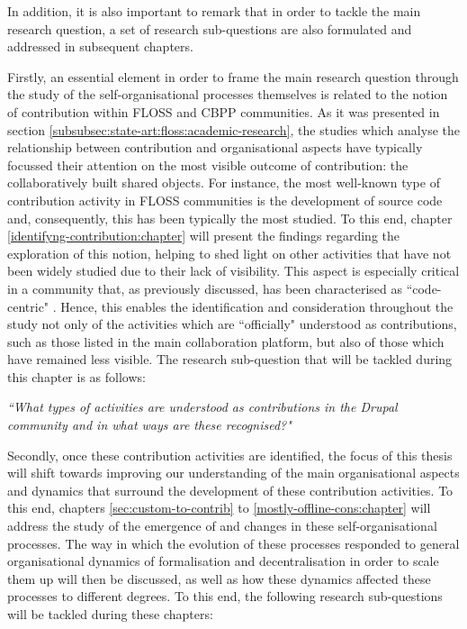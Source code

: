 In addition, it is also important to remark that in order to tackle the main research question, a set of research sub-questions are also formulated and addressed in subsequent chapters.

Firstly, an essential element in order to frame the main research question through the study of the self-organisational processes themselves is related to the notion of contribution within FLOSS and CBPP communities. As it was presented in section \ref{subsubsec:state-art:floss:academic-research}, the studies which analyse the relationship between contribution and organisational aspects have typically focussed their attention on the most visible outcome of contribution: the collaboratively built shared objects. For instance, the most well-known type of contribution activity in FLOSS communities is the development of source code and, consequently, this has been typically the most studied. To this end, chapter \ref{identifyng-contribution:chapter} will present the findings regarding the exploration of this notion, helping to shed light on other activities that have not been widely studied due to their lack of visibility. This aspect is especially critical in a community that, as previously discussed, has been characterised as ``code-centric" \parencite{Zilouchian2011, Sims2013, nordinmotivation2014}.  Hence, this enables the identification and consideration throughout the study not only of the activities which are ``officially" understood as contributions, such as those listed in the main collaboration platform, but also of those which have remained less visible. The research sub-question that will be tackled during this chapter is as follows:

\emph{``What types of activities are understood as contributions in the Drupal community and in what ways are these recognised?"}

Secondly, once these contribution activities are identified, the focus of this thesis will shift towards improving our understanding of the main organisational aspects and dynamics that surround the development of these contribution activities. To this end, chapters \ref{sec:custom-to-contrib} to \ref{mostly-offline-cons:chapter} will address the study of the emergence of and changes in these self-organisational processes. The way in which the evolution of these processes responded to general organisational dynamics of formalisation and decentralisation in order to scale them up will then be discussed, as well as how these dynamics affected these processes to different degrees. To this end, the following research sub-questions will be tackled during these chapters:


